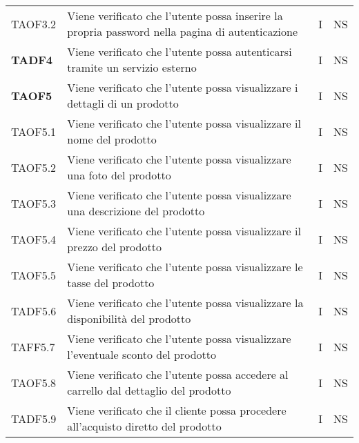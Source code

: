 \begin{center}
\begin{longtable}[!h]{p{60px} p{240px} p{35px} p{35px}}
        TAOF3.2         & Viene verificato che l'utente possa inserire la propria password nella pagina di autenticazione                      & I             & NS              \\
        \textbf{TADF4}  & Viene verificato che l'utente possa autenticarsi tramite un servizio esterno                                         & I             & NS              \\
        \textbf{TAOF5}  & Viene verificato che l'utente possa visualizzare i dettagli di un prodotto                                           & I             & NS              \\
        TAOF5.1         & Viene verificato che l'utente possa visualizzare il nome del prodotto                                                & I             & NS              \\
        TAOF5.2         & Viene verificato che l'utente possa visualizzare una foto del prodotto                                               & I             & NS              \\
        TAOF5.3         & Viene verificato che l'utente possa visualizzare una descrizione del prodotto                                        & I             & NS              \\
        TAOF5.4         & Viene verificato che l'utente possa visualizzare il prezzo del prodotto                                              & I             & NS              \\
        TAOF5.5         & Viene verificato che l'utente possa visualizzare le tasse del prodotto                                               & I             & NS              \\
        TADF5.6         & Viene verificato che l'utente possa visualizzare la disponibilità del prodotto                                       & I             & NS              \\
        TAFF5.7         & Viene verificato che l'utente possa visualizzare l'eventuale sconto del prodotto                                     & I             & NS              \\
        TAOF5.8         & Viene verificato che l'utente possa accedere al carrello dal dettaglio del prodotto                                  & I             & NS              \\
        TADF5.9         & Viene verificato che il cliente possa procedere all'acquisto diretto del prodotto                                    & I             & NS              \\

\end{longtable}
\end{center}
